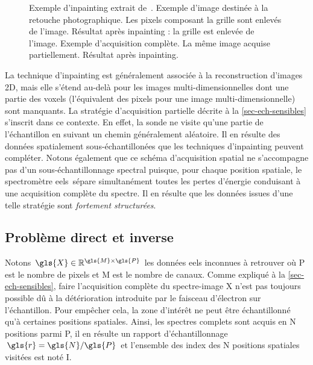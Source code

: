 \begin{figure}
    \caption{Exemple d'inpainting extrait de~\protect\cite{peyre2011numerical}. \protect{} Exemple d'image destinée à la retouche photographique. \protect{} Les pixels composant la grille sont enlevés de l'image. \protect{} Résultat après inpainting : la grille est enlevée de l'image. \protect{} Exemple d'acquisition complète. \protect{} La même image acquise partiellement. \protect{} Résultat après inpainting.
        \protect\label{fig-inpainting}} 
\end{figure}

La technique d'inpainting est généralement associée à la reconstruction d'images 2D, mais elle s'étend au-delà pour les images multi-dimensionnelles dont une partie des voxels (l'équivalent des pixels pour une image multi-dimensionnelle) sont manquants.
%
La stratégie d'acquisition partielle décrite à la \cref{sec-ech-sensibles} s'inscrit dans ce contexte. En effet, la sonde ne visite qu'une partie de l'échantillon en suivant un chemin généralement aléatoire. Il en résulte des données spatialement sous-échantillonées que les techniques d'inpainting peuvent compléter.
%
Notons également que ce schéma d'acquisition spatial ne s'accompagne pas d'un sous-échantillonnage spectral puisque, pour chaque position spatiale, le spectromètre \gls{eels} sépare simultanément toutes les pertes d'énergie conduisant à une acquisition complète du spectre. Il en résulte que les données issues d'une telle stratégie sont \emph{fortement structurées}.


\subsection{Problème direct et inverse}

Notons $\gls{X}\in\mathbb{R}^{\gls{M}\times\gls{P}}$ les données \gls{eels} inconnues à retrouver où \gls{P} est le nombre de pixels et \gls{M} est le nombre de canaux. %
%
Comme expliqué à la \cref{sec-ech-sensibles}, faire l'acquisition complète du spectre-image \gls{X} n'est pas toujours possible dû à la détérioration introduite par le faisceau d'électron sur l'échantillon. Pour empêcher cela, la zone d'intérêt ne peut être échantillonné qu'à certaines positions spatiales. Ainsi, les spectres complets sont acquis en \gls{N} positions parmi \gls{P}, il en résulte un rapport d'échantillonnage $\gls{r}=\gls{N}/\gls{P}$ et l'ensemble des index des \gls{N} positions spatiales visitées est noté \gls{I}. %

